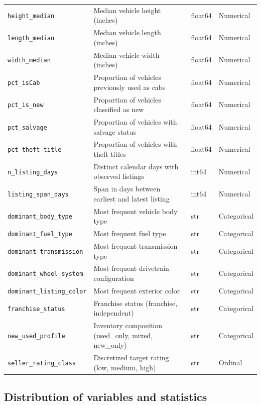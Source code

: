 \begin{table}[htbp]
\begin{tabular}{llll}
    \texttt{height\_median} & Median vehicle height (inches) & float64 & Numerical \\
    \texttt{length\_median} & Median vehicle length (inches) & float64 & Numerical \\
    \texttt{width\_median} & Median vehicle width (inches) & float64 & Numerical \\
    \texttt{pct\_isCab} & Proportion of vehicles previously used as cabs & float64 & Numerical \\
    \texttt{pct\_is\_new} & Proportion of vehicles classified as new & float64 & Numerical \\
    \texttt{pct\_salvage} & Proportion of vehicles with salvage status & float64 & Numerical \\
    \texttt{pct\_theft\_title} & Proportion of vehicles with theft titles & float64 & Numerical \\
    \texttt{n\_listing\_days} & Distinct calendar days with observed listings & int64 & Numerical \\
    \texttt{listing\_span\_days} & Span in days between earliest and latest listing & int64 & Numerical \\
    \texttt{dominant\_body\_type} & Most frequent vehicle body type & str & Categorical \\
    \texttt{dominant\_fuel\_type} & Most frequent fuel type & str & Categorical \\
    \texttt{dominant\_transmission} & Most frequent transmission type & str & Categorical \\
    \texttt{dominant\_wheel\_system} & Most frequent drivetrain configuration & str & Categorical \\
    \texttt{dominant\_listing\_color} & Most frequent exterior color & str & Categorical \\
    \texttt{franchise\_status} & Franchise status (franchise, independent) & str & Categorical \\
    \texttt{new\_used\_profile} & Inventory composition (used\_only, mixed, new\_only) & str & Categorical \\
    \texttt{seller\_rating\_class} & Discretized target rating (low, medium, high) & str & Ordinal \\
    \bottomrule
  \end{tabular}
\end{table}

\subsection{Distribution of variables and statistics}
\label{sec:distribution}

